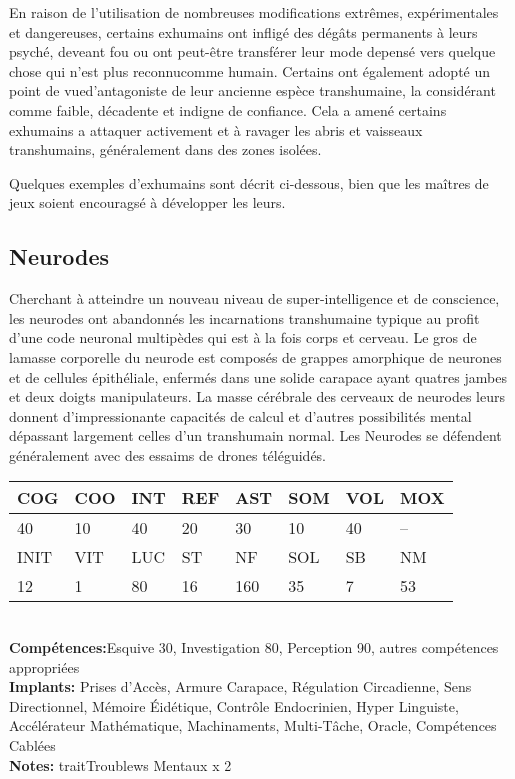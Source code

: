 En raison de l'utilisation de nombreuses modifications extrêmes, expérimentales et dangereuses, certains exhumains ont infligé des dégâts permanents à leurs psyché, deveant fou ou ont peut-être transférer leur mode depensé vers quelque chose qui n'est plus reconnucomme humain. Certains ont également adopté un point de vued'antagoniste de leur ancienne espèce transhumaine, la considérant comme faible, décadente et indigne de confiance. Cela a amené certains exhumains a attaquer activement et à ravager les abris et vaisseaux transhumains, généralement dans des zones isolées. 

Quelques exemples d'exhumains sont décrit ci-dessous, bien que les maîtres de jeux soient encouragsé à développer les leurs. 

\subsection{Neurodes} 

Cherchant à atteindre un nouveau niveau de super-intelligence et de conscience, les neurodes ont abandonnés les incarnations transhumaine typique au profit d'une code neuronal multipèdes qui est à la fois corps et cerveau. Le gros de lamasse corporelle du neurode est composés de grappes amorphique de neurones et de cellules épithéliale, enfermés dans une solide carapace ayant quatres jambes et deux doigts manipulateurs. La masse cérébrale des cerveaux de neurodes leurs donnent d'impressionante capacités de calcul et d'autres possibilités mental dépassant largement celles d'un transhumain normal. Les Neurodes se défendent généralement avec des essaims de drones téléguidés. 

\begin{tabular}{|l|l|l|l|l|l|l|l|} \hline

COG &COO &INT &REF &AST &SOM &VOL &MOX \\ \hline

40 &10 &40 &20 &30 &10 &40 &-- \\ \hline

INIT &VIT &LUC &ST &NF &SOL &SB &NM \\ \hline

12 &1 &80 &16 &160 &35 &7 &53 \\ \hline

\end{tabular} \\ \textbf{Compétences:}Esquive 30, Investigation 80, Perception 90, autres compétences appropriées \\ \textbf{Implants:} Prises d'Accès, Armure Carapace, Régulation Circadienne, Sens Directionnel, Mémoire Éidétique, Contrôle Endocrinien, Hyper Linguiste, Accélérateur Mathématique, Machinaments, Multi-Tâche, Oracle, Compétences Cablées\\ \textbf{Notes:} traitTroublews Mentaux x 2 \\ 

